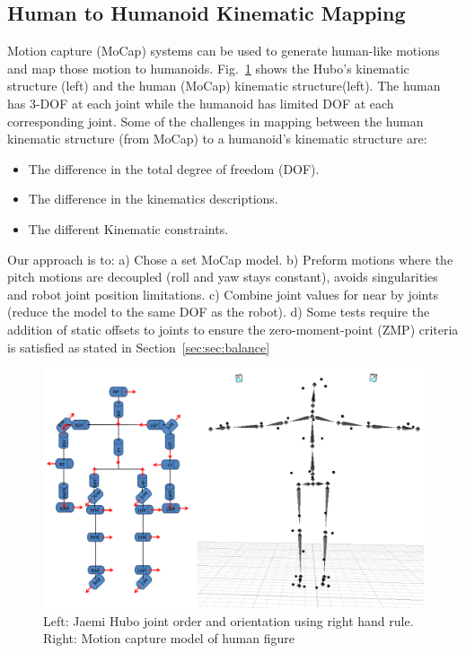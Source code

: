 \subsection{Human to Humanoid Kinematic Mapping}\label{sec:sec:mocap}

Motion capture (MoCap) systems can be used to generate human-like motions and map those motion to humanoids\cite{1545060,Polland2002}.  
Fig.~\ref{fig:mocap-joints} shows the Hubo's kinematic structure (left) and the human (MoCap) kinematic structure(left).
The human has 3-DOF at each joint while the humanoid has limited DOF at each corresponding joint.
Some of the challenges in mapping between the human kinematic structure (from MoCap) to a humanoid's kinematic structure are:

\begin{itemize}
	\item The difference in the total degree of freedom (DOF). 
	\item	The difference in the kinematics descriptions. 
	\item	The different Kinematic constraints.
\end{itemize}

Our approach is to: 
a) Chose a set MoCap model.  
b) Preform motions where the pitch motions are decoupled (roll and yaw stays constant), avoids singularities and robot joint position limitations.  
c) Combine joint values for near by joints (reduce the model to the same DOF as the robot).  
d) Some tests require the addition of static offsets to joints to ensure the zero-moment-point (ZMP) criteria is satisfied as stated in Section~\ref{sec:sec:balance}

\begin{figure}[t]
  \centering
\includegraphics[width=1.0\columnwidth]{./pix/mocapJoints.png}  \caption{Left: Jaemi Hubo joint order and orientation using right hand rule.  Right: Motion capture model of human figure}
  \label{fig:mocap-joints}
\end{figure}



